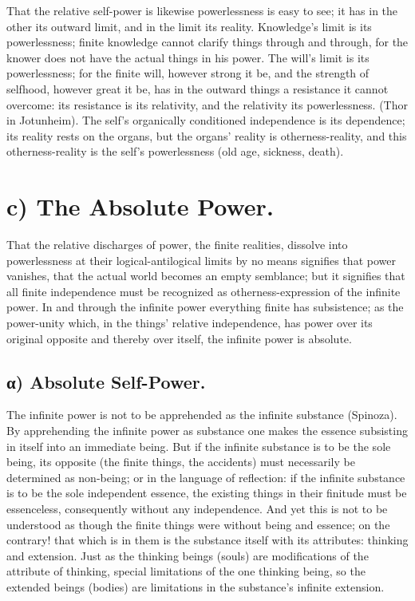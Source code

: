 \documentclass[12pt]{book}
\begin{document}
That the relative self-power is likewise powerlessness is easy to
see; it has in the other its outward limit, and in the limit its
reality. Knowledge's limit is its powerlessness; finite knowledge
cannot clarify things through and through, for the knower does not
have the actual things in his power. The will's limit is its
powerlessness; for the finite will, however strong it be, and the
strength of selfhood, however great it be, has in the outward things
a resistance it cannot overcome: its resistance is its relativity,
and the relativity its powerlessness. (Thor in Jotunheim). The
self's organically conditioned independence is its dependence; its
reality rests on the organs, but the organs' reality is
otherness-reality, and this otherness-reality is the self's
powerlessness (old age, sickness, death).

\section*{c) The Absolute Power.}

That the relative discharges of power, the finite realities,
dissolve into powerlessness at their logical-antilogical limits by
no means signifies that power vanishes, that the actual world
becomes an empty semblance; but it signifies that all finite
independence must be recognized as otherness-expression of the
infinite power. In and through the infinite power everything finite
has subsistence; as the power-unity which, in the things' relative
independence, has power over its original opposite and thereby over
itself, the infinite power is absolute.

\subsection*{α) Absolute Self-Power.}

The infinite power is not to be apprehended as the infinite
substance (Spinoza). By
apprehending the infinite power as substance one makes the essence
subsisting in itself into an immediate being. But if the infinite
substance is to be the sole being, its opposite (the finite things,
the accidents) must necessarily be determined as non-being; or in
the language of reflection: if the infinite substance is to be the
sole independent essence, the existing things in their finitude must
be essenceless, consequently without any independence. And yet this
is not to be understood as though the finite things were without
being and essence; on the contrary! that which is in them is the
substance itself with its attributes: thinking and extension. Just
as the thinking beings (souls) are modifications of the attribute of
thinking, special limitations of the one thinking being, so the
extended beings (bodies) are limitations in the substance's infinite
extension.
\end{document}

